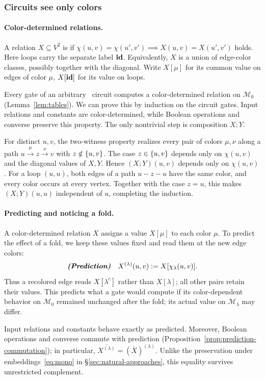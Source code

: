 \subsubsection{Circuits see only colors}\label{ov:types}

\paragraph{Color-determined relations.}
A relation $X\subseteq V^2$ is
 if
$\chi(u,v)=\chi(u',v') \implies X(u,v)=X(u',v')$ holds.
Here loops carry the separate label $\mathbf{id}$.
Equivalently, $X$ is a union of edge-color
classes, possibly together with the diagonal.
Write $X[\mu]$ for its common value on edges
of color $\mu$, $X[\mathbf{id}]$ for its value on
loops.

Every gate of an arbitrary \CoR\ circuit computes a color-determined relation on $\mathcal M_0$ (Lemma~\ref{lem:tables}).
We can prove this by induction on the
circuit gates. Input relations and constants are
color-determined, while Boolean operations and
converse preserve this property.
The only nontrivial step is composition $X;Y$.

For distinct $u,v$, the two-witness property realizes every pair of colors $\mu,\nu$ along a path $u\xrightarrow{\mu}z\xrightarrow{\nu}v$ with $z\notin\{ u,v \}$.
%
The case $z\in\{ u,v \}$ depends only on $\chi(u,v)$ and the diagonal values of $X,Y$.
Hence $(X;Y)(u,v)$ depends only on $\chi(u,v)$.
For a loop $(u,u)$, both edges of a path $u-z-u$ have the same color, and every color occurs at every vertex. 
Together with the case $z=u$, this makes $(X;Y)(u,u)$ independent of $u$, completing the induction.


\paragraph{Predicting and noticing a fold.}
A color-determined relation $X$ assigns a value $X[\mu]$ to each color $\mu$.
To predict the effect of a fold, we keep these values fixed and read them at the new edge colors:
\[
{\boldmath\textbf{\textit{(Prediction)}}}\quad
X^{(\lambda)}(u,v):=X[\chi_\lambda(u,v)].
\]
Thus a recolored edge reads $X[\lambda^c]$ rather than $X[\lambda]$; all other pairs retain their values.
%
This predicts what a gate would compute if its color-dependent behavior on $\mathcal M_0$ remained unchanged after the fold;
its actual value on $\mathcal M_\lambda$ may differ.

Input relations and constants behave exactly as predicted.
Moreover, Boolean operations and converse commute with prediction
(Proposition~\ref{prop:prediction-commutation}); in particular,
$\overline{X^{(\lambda)}}=(\overline X)^{(\lambda)}$.
Unlike the preservation under embeddings~\eqref{eq:mono} in \S\ref{sec:natural-approaches},
this equality survives unrestricted complement.

